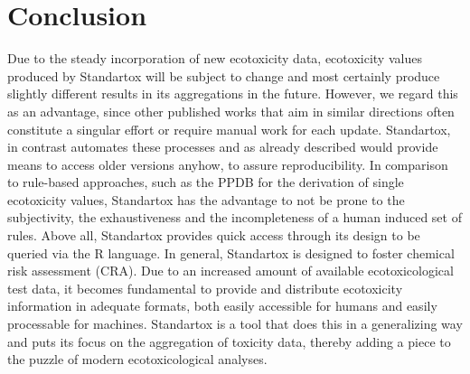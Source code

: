 \section{Conclusion}

Due to the steady incorporation of new ecotoxicity data, ecotoxicity values produced by Standartox will be subject to change and most certainly produce slightly different results in its aggregations in the future. However, we regard this as an advantage, since other published works that aim in similar directions often constitute a singular effort or require manual work for each update. Standartox, in contrast automates these processes and as already described would provide means to access older versions anyhow, to assure reproducibility. In comparison to rule-based approaches, such as the PPDB for the derivation of single ecotoxicity values, Standartox has the advantage to not be prone to the subjectivity, the exhaustiveness and the incompleteness of a human induced set of rules. Above all, Standartox provides quick access through its design to be queried via the R language. In general, Standartox is designed to foster chemical risk assessment (CRA). Due to an increased amount of available ecotoxicological test data, it becomes fundamental to provide and distribute ecotoxicity information in adequate formats, both easily accessible for humans and easily processable for machines. Standartox is a tool that does this in a generalizing way and puts its focus on the aggregation of toxicity data, thereby adding a piece to the puzzle of modern ecotoxicological analyses.